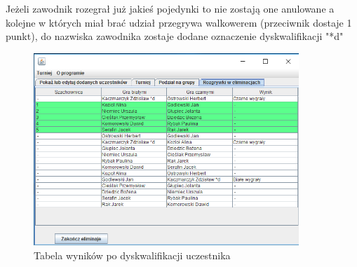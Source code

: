 Jeżeli zawodnik rozegrał już jakieś pojedynki to nie zostają one anulowane a kolejne w których miał brać udział przegrywa walkowerem (przeciwnik dostaje 1 punkt), do nazwiska zawodnika zostaje dodane oznaczenie dyskwalifikacji "*d"
\begin{figure}[H]
	\centering
	\includegraphics[width=10cm]{fig/20}
	\caption{Tabela wyników po dyskwalifikacji uczestnika}
	\label {fig:dyskwalifikacja_tabela} 
\end{figure}